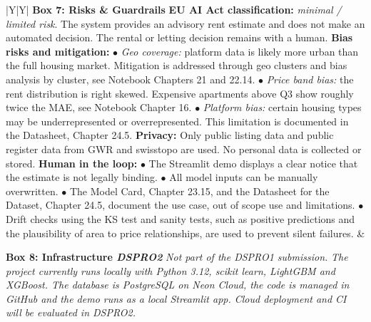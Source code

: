 \documentclass[11pt, a4paper]{article}
\begin{document}
{\begin{xltabular}{\textwidth}{|Y|Y|}
    \textbf{\color{accent}Box 7: Risks \& Guardrails} \newline
    \textbf{EU AI Act classification:} \emph{minimal / limited risk}. The system provides an advisory rent estimate and does not make an automated decision. The rental or letting decision remains with a human.
    \newline\newline
    \textbf{Bias risks and mitigation:}
    \newline $\bullet$ \emph{Geo coverage:} platform data is likely more urban than the full housing market. Mitigation is addressed through geo clusters and bias analysis by cluster, see Notebook Chapters 21 and 22.14.
    \newline $\bullet$ \emph{Price band bias:} the rent distribution is right skewed. Expensive apartments above Q3 show roughly twice the MAE, see Notebook Chapter 16.
    \newline $\bullet$ \emph{Platform bias:} certain housing types may be underrepresented or overrepresented. This limitation is documented in the Datasheet, Chapter 24.5.
    \newline\newline
    \textbf{Privacy:} Only public listing data and public register data from GWR and swisstopo are used. No personal data is collected or stored.
    \newline\newline
    \textbf{Human in the loop:}
    \newline $\bullet$ The Streamlit demo displays a clear notice that the estimate is not legally binding.
    \newline $\bullet$ All model inputs can be manually overwritten.
    \newline $\bullet$ The Model Card, Chapter 23.15, and the Datasheet for the Dataset, Chapter 24.5, document the use case, out of scope use and limitations.
    \newline $\bullet$ Drift checks using the KS test and sanity tests, such as positive predictions and the plausibility of area to price relationships, are used to prevent silent failures.
    &

    \textbf{\color{outscope}Box 8: Infrastructure \emph{DSPRO2}} \newline
    \textcolor{outscope}{\emph{Not part of the DSPRO1 submission.}}
    \newline\newline
    \textcolor{outscope}{\emph{The project currently runs locally with Python 3.12, scikit learn, LightGBM and XGBoost. The database is PostgreSQL on Neon Cloud, the code is managed in GitHub and the demo runs as a local Streamlit app. Cloud deployment and CI will be evaluated in DSPRO2.}}
    \\ \hline


\end{xltabular}}
\end{document}
